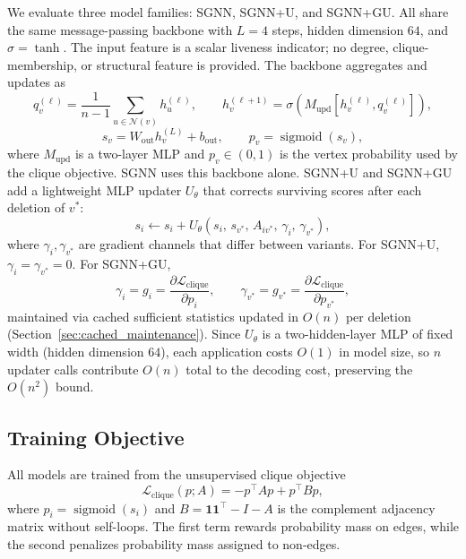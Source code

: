 \documentclass[mathematics,article,submit,pdftex,moreauthors]{Definitions/mdpi}
\begin{document}
We evaluate three model families: \textsc{SGNN}, \textsc{SGNN+U}, and \textsc{SGNN+GU}. All share the same
message-passing backbone with $L=4$ steps, hidden dimension $64$, and
$\sigma=\tanh$. The input feature is a scalar liveness indicator; no degree,
clique-membership, or structural feature is provided. The backbone aggregates and
updates as
\[
  q_v^{(\ell)} = \frac{1}{n-1}\sum_{u\in\mathcal{N}(v)} h_u^{(\ell)},
  \qquad
  h_v^{(\ell+1)} = \sigma\!\left(M_{\mathrm{upd}}\!\left[h_v^{(\ell)},
  q_v^{(\ell)}\right]\right),
\]
\[
  s_v = W_{\mathrm{out}} h_v^{(L)} + b_{\mathrm{out}},
  \qquad
  p_v = \operatorname{sigmoid}(s_v),
\]
where $M_{\mathrm{upd}}$ is a two-layer MLP and $p_v \in (0,1)$ is the vertex
probability used by the clique objective. \textsc{SGNN} uses this backbone alone. \textsc{SGNN+U} and
\textsc{SGNN+GU} add a lightweight MLP updater $U_\theta$ that corrects surviving scores
after each deletion of $v^*$:
\[
  s_i \leftarrow s_i + U_\theta(s_i,\, s_{v^*},\, A_{iv^*},\, \gamma_i,\,
  \gamma_{v^*}),
\]
where $\gamma_i, \gamma_{v^*}$ are gradient channels that differ between variants.
For \textsc{SGNN+U}, $\gamma_i = \gamma_{v^*} = 0$. For \textsc{SGNN+GU},
\[
  \gamma_i = g_i = \frac{\partial \mathcal{L}_{\mathrm{clique}}}{\partial p_i},
  \qquad
  \gamma_{v^*} = g_{v^*} = \frac{\partial \mathcal{L}_{\mathrm{clique}}}{\partial
  p_{v^*}},
\]
maintained via cached sufficient statistics updated in $O(n)$ per deletion
(Section~\ref{sec:cached_maintenance}). Since $U_\theta$ is a two-hidden-layer MLP
of fixed width (hidden dimension $64$), each application costs $O(1)$ in model size,
so $n$ updater calls contribute $O(n)$ total to the decoding cost, preserving the
$O(n^2)$ bound.

\subsection{Training Objective}
\label{sec:training_objective}

All models are trained from the unsupervised clique objective
\begin{equation}
  \mathcal{L}_{\mathrm{clique}}(p; A)
  =
  -p^\top A p
  +
  p^\top B p,
  \label{eq:clique_loss}
\end{equation}
where $p_i=\operatorname{sigmoid}(s_i)$ and
$B=\mathbf{1}\mathbf{1}^\top-I-A$ is the complement adjacency matrix without
self-loops. The first term rewards probability mass on edges, while the second
penalizes probability mass assigned to non-edges.
\end{document}
